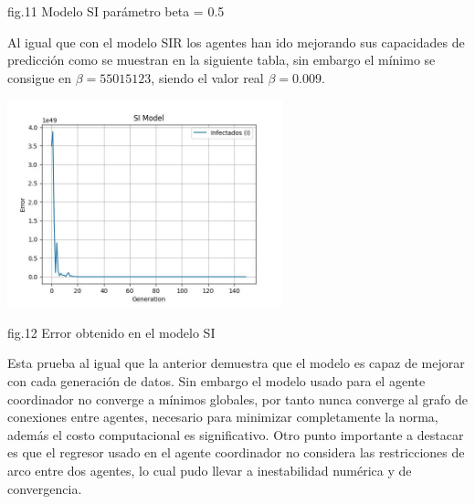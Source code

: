 \begin{center}
    \begin{center}
        fig.11 Modelo SI parámetro beta = 0.5
    \end{center} 
    

\end{center}

Al igual que con el modelo SIR los agentes han ido mejorando sus capacidades de predicción como se muestran en la siguiente tabla, sin embargo el mínimo se consigue en 
$\beta=55015123$, siendo el valor real $\beta= 0.009$. 

\begin{center}
     
 \includegraphics[width=0.6\textwidth]{images/plt1492.jpg} 
 \begin{center}
    
    fig.12 Error obtenido en el modelo SI
 \end{center}
\end{center}


Esta prueba al igual que la anterior demuestra que el modelo es capaz de mejorar con cada generación de datos. Sin embargo el modelo usado 
para el agente coordinador no converge a mínimos globales, por tanto nunca converge al grafo de conexiones entre agentes, necesario para minimizar completamente la 
norma, además el costo computacional es significativo. Otro punto importante a destacar es que el regresor usado en el agente coordinador no considera 
las restricciones de arco entre dos agentes, lo cual pudo llevar a inestabilidad numérica y de convergencia.